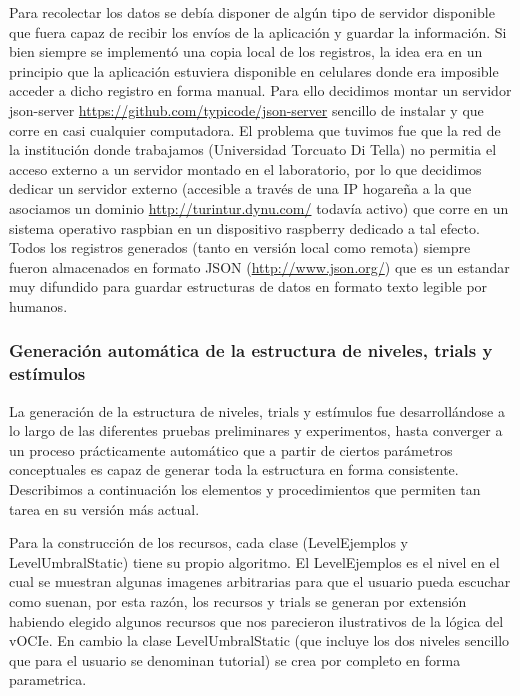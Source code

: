 \documentclass{article}
\begin{document}
    Para recolectar los datos se debía disponer de algún tipo de servidor disponible que fuera capaz de recibir los envíos de la aplicación y guardar la información. Si bien siempre se implementó una copia local de los registros, la idea era en un principio que la aplicación estuviera disponible en celulares donde era imposible acceder a dicho registro en forma manual. Para ello decidimos montar un servidor json-server \url{https://github.com/typicode/json-server} sencillo de instalar y que corre en casi cualquier computadora. El problema que tuvimos fue que la red de la institución donde trabajamos (Universidad Torcuato Di Tella) no permitia el acceso externo a un servidor montado en el laboratorio, por lo que decidimos dedicar un servidor externo (accesible a través de una IP hogareña a la que asociamos un dominio \url{http://turintur.dynu.com/} todavía activo) que corre en un sistema operativo raspbian en un dispositivo raspberry dedicado a tal efecto. Todos los registros generados (tanto en versión local como remota) siempre fueron almacenados en formato JSON (\url{http://www.json.org/}) que es un estandar muy difundido para guardar estructuras de datos en formato texto legible por humanos. 
    
    \subsubsection{Generación automática de la estructura de niveles, trials y estímulos} \label{seccion:builder}
    
    La generación de la estructura de niveles, trials y estímulos fue desarrollándose a lo largo de las diferentes pruebas preliminares y experimentos, hasta converger a un proceso prácticamente automático que a partir de ciertos parámetros conceptuales es capaz de generar toda la estructura en forma consistente. Describimos a continuación los elementos y procedimientos que permiten tan tarea en su versión más actual. 
    
    Para la construcción de los recursos, cada clase (LevelEjemplos y LevelUmbralStatic) tiene su propio algoritmo. El LevelEjemplos es el nivel en el cual se muestran algunas imagenes arbitrarias para que el usuario pueda escuchar como suenan, por esta razón, los recursos y trials se generan por extensión habiendo elegido algunos recursos que nos parecieron ilustrativos de la lógica del vOCIe. En cambio la clase LevelUmbralStatic (que incluye los dos niveles sencillo que para el usuario se denominan tutorial) se crea por completo en forma parametrica. 
    
\end{document}

